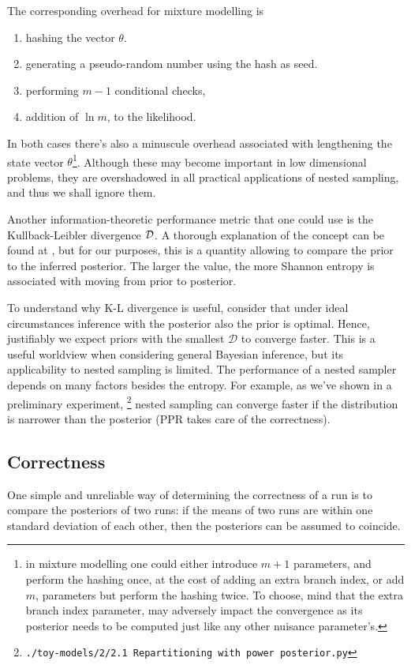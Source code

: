 \documentclass[usenatbib]{mnras}
\begin{document}
The corresponding overhead for mixture modelling is
\begin{enumerate}
\item hashing the vector \(\theta\).
\item generating a pseudo-random number using the hash as seed.
\item performing \(m-1\) conditional checks,
\item addition of \(\ln m\), to the likelihood.
\end{enumerate}

In both cases there's also a minuscule overhead associated with
lengthening the state vector \(\theta\)\footnote{in mixture modelling one could either introduce \(m+1\)
parameters, and perform the hashing once, at the cost of adding an
extra branch index, or add \(m\), parameters but perform the hashing
twice. To choose, mind that the extra branch index parameter, may
adversely impact the convergence as its posterior needs to be computed
just like any other nuisance parameter's.}.  Although these may
become important in low dimensional problems, they are overshadowed
in all practical applications of nested sampling, and thus we shall
ignore them.

Another information-theoretic performance metric that one could use
is the Kullback-Leibler divergence \({\cal D}\). A thorough
explanation of the concept can be found at \cite{Kullback_1951}, but
for our purposes, this is a quantity allowing to compare the prior
to the inferred posterior. The larger the value, the more Shannon
entropy is associated with moving from prior to posterior. 

To understand why K-L divergence is useful, consider that under
ideal circumstances inference with the posterior also the prior is
optimal. Hence, justifiably we expect priors with the smallest
\(\mathcal{D}\) to converge faster. This is a useful worldview when
considering general Bayesian inference, but its applicability to
nested sampling is limited. The performance of a nested sampler
depends on many factors besides the entropy. For example, as we've
shown in a preliminary experiment, \footnote{\texttt{./toy-models/2/2.1 Repartitioning with power posterior.py}} nested sampling can
converge faster if the distribution is narrower than the posterior
(PPR takes care of the correctness). 



\subsection{Correctness}
\label{sec:orga9d844b}
One simple and unreliable way of determining the correctness of a
run is to compare the posteriors of two runs: if the means of two
runs are within one standard deviation of each other, then the
posteriors can be assumed to coincide.
\end{document}
